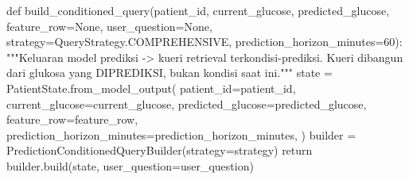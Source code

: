 def build_conditioned_query(patient_id, current_glucose,
                            predicted_glucose, feature_row=None,
                            user_question=None,
                            strategy=QueryStrategy.COMPREHENSIVE,
                            prediction_horizon_minutes=60):
    """Keluaran model prediksi -> kueri retrieval terkondisi-prediksi.
    Kueri dibangun dari glukosa yang DIPREDIKSI, bukan kondisi saat ini."""
    state = PatientState.from_model_output(
        patient_id=patient_id,
        current_glucose=current_glucose,
        predicted_glucose=predicted_glucose,
        feature_row=feature_row,
        prediction_horizon_minutes=prediction_horizon_minutes,
    )
    builder = PredictionConditionedQueryBuilder(strategy=strategy)
    return builder.build(state, user_question=user_question)

